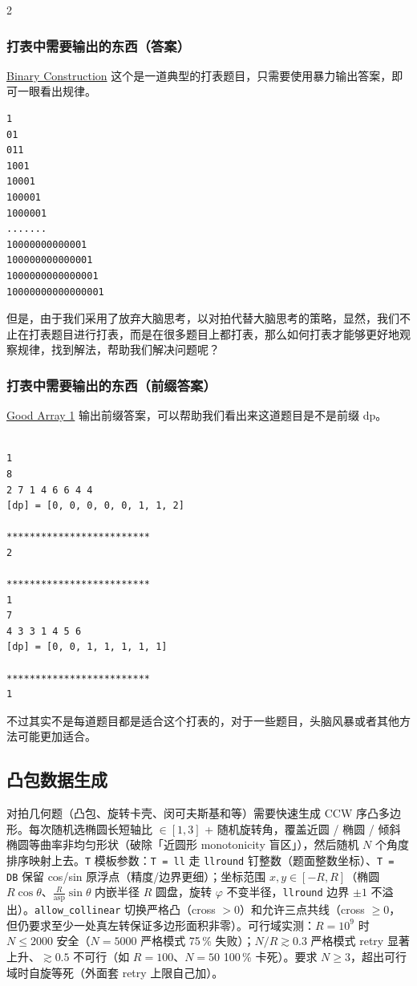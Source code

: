 \begin{multicols*}{2}
		\subsubsection{打表中需要输出的东西（答案）}
		\href{https://www.codechef.com/problems/BINCON}{Binary Construction} 这个是一道典型的打表题目，只需要使用暴力输出答案，即可一眼看出规律。

		\begin{verbatim}
1
01
011
1001
10001
100001
1000001
.......
10000000000001
100000000000001
1000000000000001
10000000000000001
		\end{verbatim}

		但是，由于我们采用了放弃大脑思考，以对拍代替大脑思考的策略，显然，我们不止在打表题目进行打表，而是在很多题目上都打表，那么如何打表才能够更好地观察规律，找到解法，帮助我们解决问题呢？

		\subsubsection{打表中需要输出的东西（前缀答案）}

		\href{https://www.codechef.com/problems/GOOD1}{Good Array 1} 输出前缀答案，可以帮助我们看出来这道题目是不是前缀 dp。

		\begin{verbatim}
	
1
8
2 7 1 4 6 6 4 4 
[dp] = [0, 0, 0, 0, 0, 1, 1, 2]

*************************
2

*************************
1
7
4 3 3 1 4 5 6 
[dp] = [0, 0, 1, 1, 1, 1, 1]

*************************
1

		\end{verbatim}

		不过其实不是每道题目都是适合这个打表的，对于一些题目，头脑风暴或者其他方法可能更加适合。

		\subsection{凸包数据生成}

		对拍几何题（凸包、旋转卡壳、闵可夫斯基和等）需要快速生成 CCW 序凸多边形。每次随机选椭圆长短轴比 $\in [1, 3]$ + 随机旋转角，覆盖近圆 / 椭圆 / 倾斜椭圆等曲率非均匀形状（破除「近圆形 monotonicity 盲区」），然后随机 $N$ 个角度排序映射上去。\texttt{T} 模板参数：\texttt{T = ll} 走 \texttt{llround} 钉整数（题面整数坐标）、\texttt{T = DB} 保留 cos/sin 原浮点（精度/边界更细）；坐标范围 $x, y \in [-R, R]$（椭圆 $R \cos \theta$、$\tfrac{R}{\text{asp}}\sin \theta$ 内嵌半径 $R$ 圆盘，旋转 $\varphi$ 不变半径，\texttt{llround} 边界 $\pm 1$ 不溢出）。\texttt{allow\_collinear} 切换严格凸（cross $> 0$）和允许三点共线（cross $\ge 0$，但仍要求至少一处真左转保证多边形面积非零）。可行域实测：$R = 10^9$ 时 $N \le 2000$ 安全（$N = 5000$ 严格模式 75\,\% 失败）；$N/R \gtrsim 0.3$ 严格模式 retry 显著上升、$\gtrsim 0.5$ 不可行（如 $R = 100$、$N = 50$ 100\,\% 卡死）。要求 $N \ge 3$，超出可行域时自旋等死（外面套 retry 上限自己加）。


\end{multicols*}
